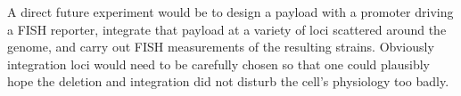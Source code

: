 A direct  future experiment would be
to design a payload with a promoter driving a FISH reporter,
integrate that payload at a variety of loci scattered around the genome,
and carry out FISH measurements of the resulting strains.
Obviously integration loci would need to be carefully chosen so
that one could plausibly hope the deletion and integration did
not disturb the cell's physiology too badly.